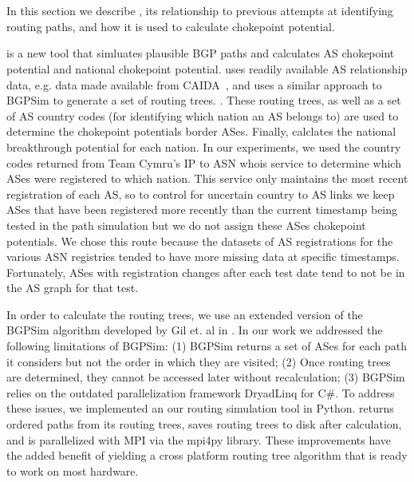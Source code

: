 
\section{\toolname}

In this section we describe \toolname{}, its relationship to previous attempts
at identifying routing paths, and how it is used to calculate chokepoint
potential.

\toolname{} is a new tool that simluates plausible BGP paths and calculates AS
chokepoint potential and national chokepoint potential.  \toolname{} uses
readily available AS relationship data, e.g. data made available from
CAIDA~\cite{CAIDA}, and uses a similar approach to BGPSim \cite{quicksand} to
generate a set of routing trees. . These routing trees, as well as a set of AS
country codes (for identifying which nation an AS belongs to) are used to
determine the chokepoint potentials border ASes.  Finally, \toolname{}
calclates the national breakthrough potential for each nation. In our
experiments, we used the country codes returned from Team Cymru's IP to ASN
whois service \cite{cymru} to determine which ASes were registered to which
nation.  This service only maintains the most recent registration of each AS,
so to control for uncertain country to AS links we keep ASes that have been
registered more recently than the current timestamp being tested in the path
simulation but we do not assign these ASes chokepoint
potentials. We chose this
route because the datasets of AS registrations for the various ASN registries
tended to have more missing data at specific timestamps.  Fortunately, ASes
with registration changes after each test date tend to not be in the AS graph
for that test. 

\par In order to calculate the routing trees, we use an extended version of the
BGPSim algorithm developed by Gil et. al in \cite{quicksand}. In our work we
addressed the following limitations of BGPSim: (1) BGPSim returns a set of ASes
for each path it considers but not the order in which they are visited; (2)
Once routing trees are determined, they cannot be accessed later without
recalculation; (3) BGPSim relies on the outdated parallelization framework
DryadLinq for C\#. To address these issues, we implemented an our routing
simulation tool in Python. \toolname{} returns ordered paths from its routing trees, saves
routing trees to disk after calculation, and is parallelized with MPI via the
mpi4py library. These improvements have the added benefit of yielding a cross
platform routing tree algorithm that is ready to work on most hardware.

